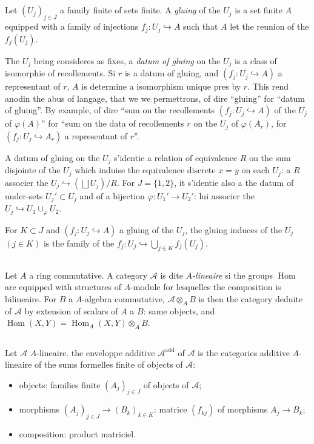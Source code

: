 \documentclass[11pt,a4paper]{article}
\theoremstyle{plain}
\theoremstyle{definition}
\DeclareMathOperator{\Hom}{Hom}
\newcommand{\inj}{\hookrightarrow}
\begin{document}
\subsection{}
Let $(U_j)_{j \in J}$ a family finite of sets finite. A \emph{gluing} of the $U_j$ is a set finite $A$ equipped with a family of injections $f_j : U_j \inj A$ such that $A$ let the reunion of the $f_j(U_j)$.

The $U_j$ being consideres as fixes, a \emph{datum of gluing} on the $U_j$ is a class of isomorphie of recollements. Si $r$ is a datum of gluing, and $(f_j : U_j \inj A)$ a representant of $r$, $A$ is determine a isomorphism unique pres by $r$. This rend anodin the abus of langage, that we we permettrons, of dire ``gluing'' for ``datum of gluing''. By example, of dire ``sum on the recollements $(f_j : U_j \inj A)$ of the $U_j$ of $\varphi(A)$'' for ``sum on the data of recollements $r$ on the $U_j$ of $\varphi(A_r)$, for $(f_j : U_j \inj A_r)$ a representant of $r$''.

A datum of gluing on the $U_j$ s'identie a relation of equivalence $R$ on the sum disjointe of the $U_j$ which induise the equivalence discrete $x = y$ on each $U_j$: a $R$ associer the $U_j \inj (\bigsqcup U_j)/R$. For $J = \{1, 2\}$, it s'identie also a the datum of under-sets $U_j' \subset U_j$ and of a bijection $\varphi : U_1' \to U_2'$: lui associer the $U_j \inj U_1 \cup_\varphi U_2$.

For $K \subset J$ and $(f_j : U_j \inj A)$ a gluing of the $U_j$, the gluing induces of the $U_j$ $(j \in K)$ is the family of the $f_j : U_j \inj \bigcup_{j \in K} f_j(U_j)$.

\subsection{}
Let $A$ a ring commutative. A category $\mathcal{A}$ is dite $A$\emph{-lineaire} si the groups $\Hom$ are equipped with structures of $A$-module for lesquelles the composition is bilineaire. For $B$ a $A$-algebra commutative, $\mathcal{A} \otimes_A B$ is then the category deduite of $\mathcal{A}$ by extension of scalars of $A$ a $B$: same objects, and $\Hom(X,Y) = \Hom_A(X,Y) \otimes_A B$.

\subsection{}
Let $\mathcal{A}$ $A$-lineaire. the enveloppe additive $\mathcal{A}^{\text{add}}$ of $\mathcal{A}$ is the categories additive $A$-lineaire of the sums formelles finite of objects of $\mathcal{A}$:
\begin{itemize}[label={},leftmargin=*]
\item objects: families finite $(A_j)_{j \in J}$ of objects of $\mathcal{A}$;
\item morphisms $(A_j)_{j \in J} \to (B_k)_{k \in K}$: matrice $(f_{kj})$ of morphisms $A_j \to B_k$;
\item composition: product matriciel.
\end{itemize}
\end{document}

